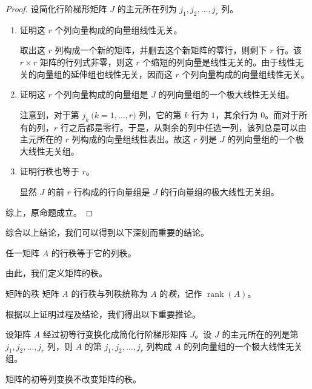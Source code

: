 \begin{proof}
	设简化行阶梯形矩阵 $J$ 的主元所在列为 $j_1, j_2, \ldots, j_r$ 列。

	\begin{enumerate}
		\item 证明这 $r$ 个列向量构成的向量组线性无关。

		取出这 $r$ 列构成一个新的矩阵，并删去这个新矩阵的零行，则剩下 $r$ 行。该 $r \times r$ 矩阵的行列式非零，则这 $r$ 个缩短的列向量是线性无关的。由于线性无关的向量组的延伸组也线性无关，因而这 $r$ 个列向量构成的向量组线性无关。

		\item 证明这 $r$ 个列向量构成的向量组是 $J$ 的列向量组的一个极大线性无关组。

		注意到，对于第 $j_k \pod{k = 1, \ldots, r}$ 列，它的第 $k$ 行为 $1$，其余行为 $0$。而对于所有的列，$r$ 行之后都是零行。于是，从剩余的列中任选一列，该列总是可以由主元所在的 $r$ 列构成的向量组线性表出。故这 $r$ 列是 $J$ 的列向量组的一个极大线性无关组。

		\item 证明行秩也等于 $r$。

		显然 $J$ 的前 $r$ 行构成的行向量组是 $J$ 的行向量组的极大线性无关组。
	\end{enumerate}

	综上，原命题成立。
\end{proof}

综合以上结论，我们可以得到以下深刻而重要的结论。

\begin{theorem}
	任一矩阵 $A$ 的行秩等于它的列秩。
\end{theorem}

由此，我们定义矩阵的秩。

\begin{definition}{矩阵的秩}
	矩阵 $A$ 的行秩与列秩统称为 $A$ 的\emph{秩}，记作 $\operatorname{rank}(A)$。
\end{definition}

根据以上证明过程及结论，我们得出以下重要推论。

\begin{theorem}
	设矩阵 $A$ 经过初等行变换化成简化行阶梯形矩阵 $J$。设 $J$ 的主元所在的列是第 $j_1, j_2, \ldots, j_r$ 列，则 $A$ 的第 $j_1, j_2, \ldots, j_r$ 列构成 $A$ 的列向量组的一个极大线性无关组。
\end{theorem}

\begin{theorem}
	矩阵的初等列变换不改变矩阵的秩。
\end{theorem}

